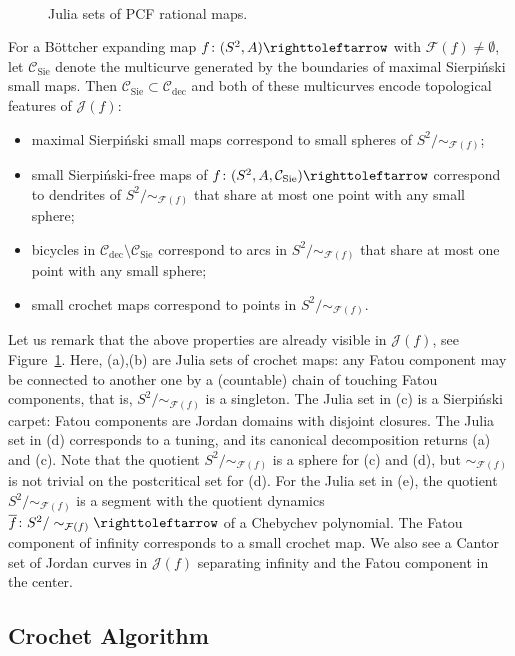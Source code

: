 \documentclass{amsart}
\theoremstyle{plain}
\theoremstyle{definition}
\theoremstyle{remark}
\newcommand{\Fat}{{\mathcal F}}
\newcommand{\Jul}{{\mathcal J}}
\newcommand{\CC}{{\mathcal C}}
\newcommand\selfmap{\righttoleftarrow}
\newcommand{\cro}{{\operatorname{dec}}}
\newcommand{\Sie}{{\operatorname{Sie}}}
\begin{document}
\begin{figure}[t]
          \mbox{}\\
  \caption{Julia sets of PCF rational maps.}
\label{fig:Julia-sets}
\end{figure}

For a B\"ottcher expanding map $f\colon (S^2,A)\selfmap$ with $\Fat(f)\not=\emptyset$, let $\CC_\Sie$ denote the multicurve generated by the boundaries of maximal Sierpi\'{n}ski small maps. Then $\CC_\Sie\subset \CC_\cro$ and both of these multicurves encode topological features of $\Jul(f)$:
\begin{itemize}
\item maximal Sierpi\'{n}ski small maps correspond to small spheres of $S^2/\sim_{\Fat(f)}$;
\item small Sierpi\'{n}ski-free maps of $f\colon (S^2,A,\CC_\Sie)\selfmap$ correspond to dendrites of $S^2/\sim_{\Fat(f)}$ that share at most one point with any small sphere; 
\item bicycles in $\CC_\cro\setminus \CC_\Sie$ correspond to arcs in $S^2/\sim_{\Fat(f)}$ that share at most one point with any small sphere;
\item small crochet maps correspond to points in $S^2/\sim_{\Fat(f)}$.
\end{itemize}
Let us remark that the above properties are already visible in $\Jul(f)$, see Figure~\ref{fig:Julia-sets}. Here, (a),(b) are Julia sets of crochet maps: any Fatou component may be connected to another one by a (countable) chain of touching Fatou components, that is, $S^2/\sim_{\Fat(f)}$ is a singleton.  The Julia set in (c) is a Sierpi\'{n}ski carpet: Fatou components are Jordan domains with disjoint closures.  The  Julia set in (d) corresponds to a tuning, and its canonical decomposition returns (a) and (c). Note that the quotient $S^2/\sim_{\Fat(f)}$ is a sphere for (c) and (d), but $\sim_{\Fat(f)}$ is not trivial on the postcritical set for (d).  For the Julia set in (e), the quotient $S^2/\sim_{\Fat(f)}$  is a segment with the quotient dynamics $\overline f\colon S^2/\sim_{\Fat(f)}\selfmap$ of a Chebychev polynomial.  The Fatou component of infinity corresponds to a small crochet map.  We also see a Cantor set of Jordan curves in $\mathcal{J}(f)$ separating infinity and the Fatou component in the center.



\subsection{Crochet Algorithm}\label{ss: crochet_algo_intro}
\end{document}
